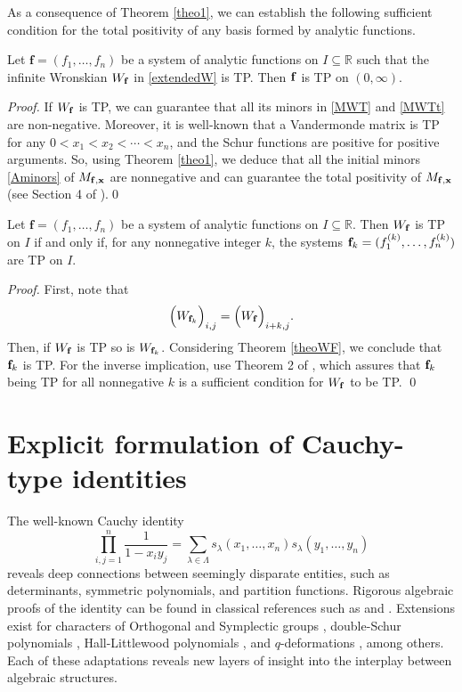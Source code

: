 \documentclass[smallextended]{svjour3}       %
\begin{document}
As a consequence of Theorem \ref{theo1}, we can establish the following sufficient condition for the total positivity of any basis formed by analytic functions.

\begin{theorem}\label{theoWF}
Let  \( \mathbf{f} = (f_1, \ldots, f_n) \) be a system of analytic functions on \( I \subseteq \mathbb{R} \) such that the infinite Wronskian  \( W_{\bf f} \)  in \eqref{extendedW} is TP. Then 
    ${\bf f}$ is TP on $(0,\infty)$.
\end{theorem}
\begin{proof}
If \( W_{\bf f} \) is TP, we can guarantee that all its minors in \eqref{MWT} and \eqref{MWTt} are non-negative. 
Moreover, it is well-known that a Vandermonde matrix is TP for any \( 0 < x_1 < x_2 < \cdots < x_n \), and the Schur functions are positive for positive arguments. 
So, using Theorem  \ref{theo1}, we deduce that all the initial minors  \eqref{Aminors} of \(M_{\bf f, \bf x}\)  are nonnegative and can guarantee the total positivity of   \(M_{\bf f, \bf x}\) (see Section 4 of \cite{Gasca1}).\qed
\end{proof}



\begin{theorem}
Let \( \mathbf{f} = (f_1, \ldots, f_n) \) be a system of analytic functions on \( I \subseteq \mathbb{R} \). Then $W_{\bf f}$ is TP on $I$
      if and only if, for any nonnegative integer $k$, the systems \({\bf f}_k=(f_1^{(k)},\dots, f_n^{(k)})\)  are TP on $I$.  
\end{theorem}
\begin{proof}
   First, note that
   \[
   \Big(W_{{\bf f}_k}\Big)_{i,j}=\Big(W_{\bf f}\Big)_{i+k,j}.
   \] 
   Then, if $W_{\bf f}$ is TP so is $W_{{\bf f}_k}$. Considering Theorem \ref{theoWF}, we conclude that  ${\bf f}_k$ is TP.  
    For the inverse implication, use Theorem 2 of \cite{DMR2}, which assures that ${\bf f}_k$ being TP for all nonnegative $k$ is a sufficient condition for $W_{\bf f}$ to be TP. \qed
\end{proof}


\section{Explicit formulation of Cauchy-type identities}\label{sec:cauchy_identities}
 
The well-known   Cauchy identity 
\begin{equation} \label{eq:Cauchy}
\prod_{i,j=1}^n \frac{1}{1 - x_i y_j} = \sum_{\lambda\in\Lambda} s_\lambda(x_1, \ldots, x_n) s_\lambda(y_1,\ldots, y_n)
\end{equation} 
reveals deep connections between seemingly disparate entities, such as determinants, symmetric polynomials, and partition functions. Rigorous algebraic proofs
of the identity can be found in classical references such as \cite{Mac} and \cite{Stanley}.  Extensions exist for characters of Orthogonal and Symplectic groups \cite{ortho}, double-Schur polynomials \cite{double}, Hall-Littlewood polynomials \cite{Hall}, and
$q$-deformations \cite{quantum}, among others. Each of these adaptations reveals new layers of insight into the interplay between algebraic structures.
\end{document}
